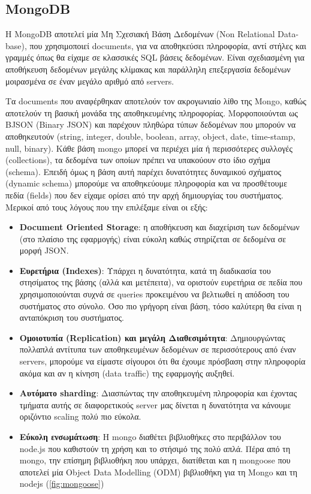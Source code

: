 \subsection{MongoDB}
\label{subsec:mongodb}

H MongoDB αποτελεί μία Μη Σχεσιακή Βάση Δεδομένων (Non Relational Data\hyp{}base), που χρησιμοποιεί documents,
για να αποθηκεύσει πληροφορία, αντί στήλες και γραμμές όπως θα είχαμε σε κλασσικές SQL βάσεις δεδομένων.
Είναι σχεδιασμένη για αποθήκευση δεδομένων μεγάλης κλίμακας και παράλληλη επεξεργασία δεδομένων μοιρασμένα
σε έναν μεγάλο αριθμό από servers. 

Τα documents που αναφέρθηκαν αποτελούν τον ακρογωνιαίο λίθο της Mongo, καθώς αποτελούν τη βασική μονάδα
της αποθηκευμένης πληροφορίας. Μορφοποιούνται ως BJSON (Binary JSON) και παρέχουν πληθώρα τύπων δεδομένων
που μπορούν να αποθηκευτούν (string, integer, double, boolean, array, object, date, time\hyp{}stamp, null, binary). Κάθε βάση mongo μπορεί να περιέχει μία ή περισσότερες συλλογές (collections),
τα δεδομένα των οποίων πρέπει να υπακούουν στο ίδιο σχήμα (schema). Επειδή όμως η βάση αυτή παρέχει
δυνατότητες δυναμικού σχήματος (dynamic schema) μπορούμε να αποθηκεύουμε πληροφορία και να προσθέτουμε πεδία (fields)
που δεν είχαμε ορίσει από την αρχή δημιουργίας του συστήματος. \\

Μερικοί από τους λόγους που την επιλέξαμε είναι οι εξής:

\begin{itemize}
	\item \textbf{Document Oriented Storage}: η αποθήκευση και διαχείριση των δεδομένων
		(στο πλαίσιο της εφαρμογής) είναι εύκολη καθώς στηρίζεται σε δεδομένα σε μορφή JSON.
	\item \textbf{Ευρετήρια (Indexes)}: Υπάρχει η δυνατότητα, κατά τη διαδικασία του στησίματος της βάσης (αλλά και μετέπειτα),
		να οριστούν ευρετήρια σε πεδία που χρησιμοποιούνται συχνά σε queries προκειμένου
		να βελτιωθεί η απόδοση του συστήματος στο σύνολο. Όσο πιο γρήγορη είναι βάση, τόσο
		καλύτερη θα είναι η ανταπόκριση του συστήματος. 
	\item \textbf{Ομοιοτυπία (Replication) και μεγάλη Διαθεσιμότητα}: Δημιουργώντας πολλαπλά αντίτυπα των αποθηκευμένων δεδομένων	
		σε περισσότερους από έναν servers, μπορούμε να είμαστε σίγουροι ότι θα έχουμε πρόσβαση στην
		πληροφορία ακόμα και αν η κίνηση (data traffic) της εφαρμογής αυξηθεί.
	\item \textbf{Αυτόματο sharding}: Διασπώντας την αποθηκευμένη πληροφορία και έχοντας τμήματα αυτής σε διαφορετικούς server
		μας δίνεται η δυνατότητα να κάνουμε οριζόντιο scaling πολύ πιο εύκολα. 
	\item \textbf{Εύκολη ενσωμάτωση}: Η mongo διαθέτει βιβλιοθήκες στο περιβάλλον του node.js που καθιστούν
		τη χρήση και το στήσιμό της πολύ απλά. Πέρα από τη mongo, την επίσημη βιβλιοθήκη που υπάρχει,
		διατίθεται και η mongoose που αποτελεί μία Object Data Modelling (ODM) βιβλιοθήκη για τη Mongo και τη nodejs (\autoref{fig:mongoose}) 
\end{itemize}

